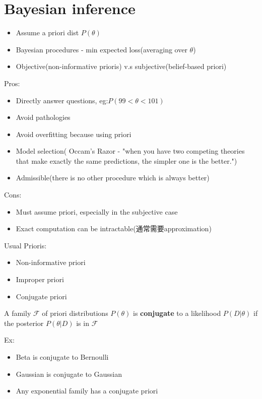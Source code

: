 \documentclass{article}
\begin{document}
\section{Bayesian inference}
\begin{itemize}
\item Assume a priori dist $P(\theta)$
\item Bayesian procedures - min expected loss(averaging over $\theta$)
\item Objective(non-informative prioris) v.s subjective(belief-based priori)
\end{itemize}

Pros:
\begin{itemize}
\item Directly answer questions, eg:$P(99 < \theta < 101)$
\item Avoid pathologies
\item Avoid overfitting because using priori
\item Model selection( Occam's Razor - "when you have two competing theories that make exactly the same predictions, the simpler one is the better.")
\item Admissible(there is no other procedure which is always better)
\end{itemize}

Cons:
\begin{itemize}
\item Must assume priori, especially in the subjective case
\item Exact computation can be intractable(通常需要approximation)
\end{itemize}

Usual Prioris:
\begin{itemize}
\item Non-informative priori
\item Improper priori
\item Conjugate priori
\end{itemize}

\begin{definition}
\end{definition}
A family $\mathcal{F}$ of priori distributions $P(\theta)$ is \textbf{conjugate} to a likelihood $P(D|\theta)$ 
if the posterior $P(\theta|D)$ is in $\mathcal{F}$

Ex:
\begin{itemize}
\item Beta is conjugate to Bernoulli
\item Gaussian is conjugate to Gaussian
\item Any exponential family has a conjugate priori
\end{itemize}
\end{document}
